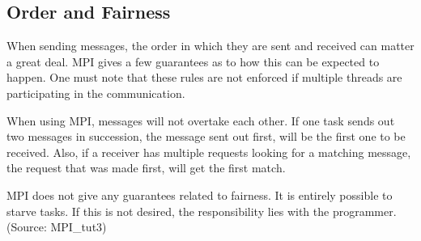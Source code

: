 \subsection{Order and Fairness}
When sending messages, the order in which they are sent and received can matter a great deal. MPI gives a few guarantees as to how this can be expected to happen. One must note that these rules are not enforced if multiple threads are participating in the communication.

When using MPI, messages will not overtake each other. If one task sends out two messages in succession, the message sent out first, will be the first one to be received. Also, if a receiver has multiple requests looking for a matching message, the request that was made first, will get the first match.

MPI does not give any guarantees related to fairness. It is entirely possible to starve tasks. If this is not desired, the responsibility lies with the programmer.
(Source: MPI\_tut3)